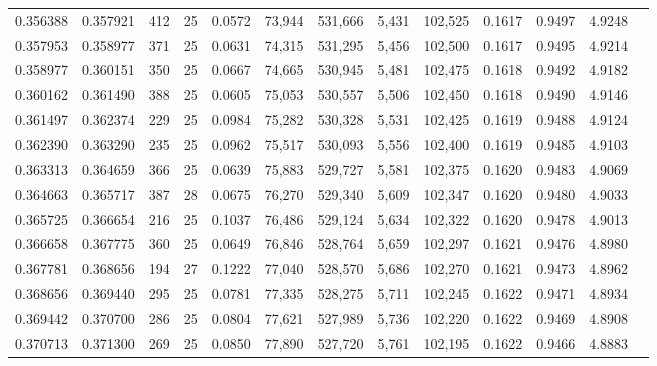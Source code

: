 \begin{tabular}{rrrrrrrrrrrrr}
0.356388 & 0.357921 &   412 &  25 &                                     0.0572 &  73,944 & 531,666 &   5,431 & 102,525 & 0.1617 & 0.9497 & 4.9248 \\
0.357953 & 0.358977 &   371 &  25 &                                     0.0631 &  74,315 & 531,295 &   5,456 & 102,500 & 0.1617 & 0.9495 & 4.9214 \\
0.358977 & 0.360151 &   350 &  25 &                                     0.0667 &  74,665 & 530,945 &   5,481 & 102,475 & 0.1618 & 0.9492 & 4.9182 \\
0.360162 & 0.361490 &   388 &  25 &                                     0.0605 &  75,053 & 530,557 &   5,506 & 102,450 & 0.1618 & 0.9490 & 4.9146 \\
0.361497 & 0.362374 &   229 &  25 &                                     0.0984 &  75,282 & 530,328 &   5,531 & 102,425 & 0.1619 & 0.9488 & 4.9124 \\
0.362390 & 0.363290 &   235 &  25 &                                     0.0962 &  75,517 & 530,093 &   5,556 & 102,400 & 0.1619 & 0.9485 & 4.9103 \\
0.363313 & 0.364659 &   366 &  25 &                                     0.0639 &  75,883 & 529,727 &   5,581 & 102,375 & 0.1620 & 0.9483 & 4.9069 \\
0.364663 & 0.365717 &   387 &  28 &                                     0.0675 &  76,270 & 529,340 &   5,609 & 102,347 & 0.1620 & 0.9480 & 4.9033 \\
0.365725 & 0.366654 &   216 &  25 &                                     0.1037 &  76,486 & 529,124 &   5,634 & 102,322 & 0.1620 & 0.9478 & 4.9013 \\
0.366658 & 0.367775 &   360 &  25 &                                     0.0649 &  76,846 & 528,764 &   5,659 & 102,297 & 0.1621 & 0.9476 & 4.8980 \\
0.367781 & 0.368656 &   194 &  27 &                                     0.1222 &  77,040 & 528,570 &   5,686 & 102,270 & 0.1621 & 0.9473 & 4.8962 \\
0.368656 & 0.369440 &   295 &  25 &                                     0.0781 &  77,335 & 528,275 &   5,711 & 102,245 & 0.1622 & 0.9471 & 4.8934 \\
0.369442 & 0.370700 &   286 &  25 &                                     0.0804 &  77,621 & 527,989 &   5,736 & 102,220 & 0.1622 & 0.9469 & 4.8908 \\
0.370713 & 0.371300 &   269 &  25 &                                     0.0850 &  77,890 & 527,720 &   5,761 & 102,195 & 0.1622 & 0.9466 & 4.8883 \\

\end{tabular}
